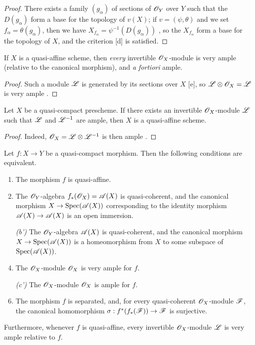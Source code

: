 \begin{proof}
\label{proof-2.5.1.3}
There exists a family $(g_\alpha)$ of sections of $\mathscr{O}_Y$ over $Y$ such that the $D(g_\alpha)$ form a base for the topology of $v(X)$;
if $v=(\psi,\theta)$ and we set $f_\alpha=\theta(g_\alpha)$, then we have $X_{f_\alpha}=\psi^{-1}(D(g_\alpha))$ , so the $X_{f_\alpha}$ form a base for the topology of $X$, and the criterion [d] is satisfied.
\end{proof}

\begin{cor}[5.1.4]
\label{2.5.1.4}
If $X$ is a quasi-affine scheme, then \emph{every} invertible $\mathscr{O}_X$-module is very ample (relative to the canonical morphism), and \emph{a fortiori} ample.
\end{cor}

\begin{proof}
\label{proof-2.5.1.4}
Such a module $\mathscr{L}$ is generated by its sections over $X$ [e], so $\mathscr{L}\otimes\mathscr{O}_X=\mathscr{L}$ is very ample .
\end{proof}

\begin{cor}[5.1.5]
\label{2.5.1.5}
Let $X$ be a quasi-compact prescheme.
If there exists an invertible $\mathscr{O}_X$-module $\mathscr{L}$ such that $\mathscr{L}$ and $\mathscr{L}^{-1}$ are ample, then $X$ is a quasi-affine scheme.
\end{cor}

\begin{proof}
\label{proof-2.5.1.5}
Indeed, $\mathscr{O}_X=\mathscr{L}\otimes\mathscr{L}^{-1}$ is then ample .
\end{proof}

\begin{prop}[5.1.6]
\label{2.5.1.6}
Let $f:X\to Y$ be a quasi-compact morphism.
Then the following conditions are equivalent.
\begin{enumerate}[label=\emph{(\alph*)}]
  \item The morphism $f$ is quasi-affine.
  \item The $\mathscr{O}_Y$-algebra $f_*(\mathscr{O}_X)=\mathscr{A}(X)$ is quasi-coherent, and the canonical morphism $X\to\Spec(\sh{A}(X))$ corresponding to the identity morphism $\sh{A}(X)\to\sh{A}(X)$  is an open immersion.
  \item[\emph{(b')}] The $\mathscr{O}_Y$-algebra $\mathscr{A}(X)$ is quasi-coherent, and the canonical morphism $X\to\Spec(\sh{A}(X))$ is a homeomorphism from $X$ to some subspace of ${\mathop{\mathrm{Spec}}\nolimits}(\mathscr{A}(X))$.
  \item The $\mathscr{O}_X$-module $\mathscr{O}_X$ is very ample for $f$.
  \item[\emph{(c')}] The $\mathscr{O}_X$-module $\mathscr{O}_X$ is ample for $f$.
  \item The morphism $f$ is separated, and, for every quasi-coherent $\mathscr{O}_X$-module $\mathscr{F}$, the canonical homomorphism $\sigma:f^*(f_*(\sh{F}))\to\sh{F}$  is surjective.
\end{enumerate}

Furthermore, whenever $f$ is quasi-affine, every invertible $\mathscr{O}_X$-module $\mathscr{L}$ is very ample relative to $f$.
\end{prop}

